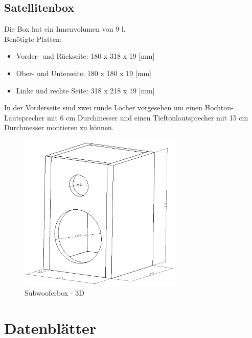 \subsection{Satellitenbox}
Die Box hat ein Innenvolumen von 9 l.\\
Benötigte Platten:
\begin{itemize}
	\item Vorder- und Rückseite: 180 x 318 x 19 [mm]
	\item Ober- und Unterseite: 180 x 180 x 19 [mm]
	\item Linke und rechte Seite: 318 x 218 x 19 [mm]
\end{itemize}
In der Vorderseite sind zwei runde Löcher vorgesehen um einen Hochton-Lautsprecher mit 6 cm Durchmesser und einen Tieftonlautsprecher mit 15 cm Durchmesser montieren zu können.

\begin{figure} [H]
	\centering
	\includegraphics[width=0.7\textwidth]{img/Fertigungsunterlagen/Satellitenbox.png}
	\caption{Subwooferbox - 3D}
	\label {fig:8.11.4}
\end{figure}



\newpage
\section{Datenblätter}\label{sec:8.2}
